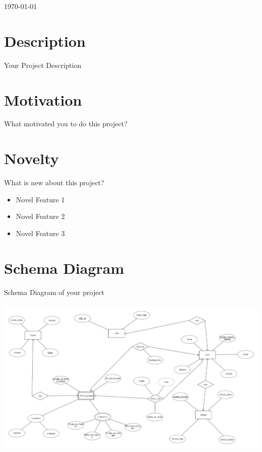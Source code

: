 \begin{titlepage}
	\vfill\vfill\vfill %
	
	{\large\today} %
	
	
	 
	
	\vfill %
	
\end{titlepage}


\section{Description}
Your Project Description
\clearpage

\section{Motivation}
What motivated you to do this project?
\clearpage

\section{Novelty}

What is new about this project?

\begin{itemize}
\item Novel Feature 1
\item Novel Feature 2
\item Novel Feature 3
\end{itemize}

\clearpage

\section{Schema Diagram}
Schema Diagram of your project \\ 
\\
\includegraphics[scale=0.5]{Schema}

